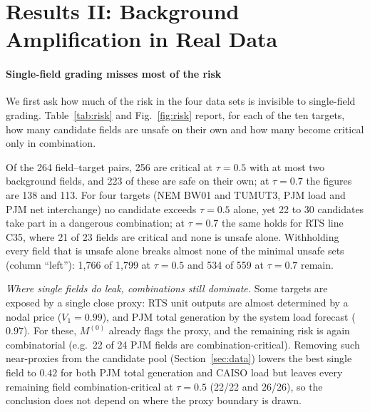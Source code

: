 \section{Results II: Background Amplification in Real Data}\label{sec:res-amp}

\paragraph{Single-field grading misses most of the risk}


We first ask how much of the risk in the four data sets is invisible to single-field grading.
Table~\ref{tab:risk} and Fig.~\ref{fig:risk} report, for each of the ten targets, how many
candidate fields are unsafe on their own and how many become critical only in combination.

Of the 264 field--target
pairs, 256 are critical at $\tau=0.5$ with at most two background fields, and 223 of these are
safe on their own; at $\tau=0.7$ the figures are 138 and 113. For four targets (NEM BW01 and
TUMUT3, PJM load and PJM net interchange) no candidate exceeds $\tau=0.5$ alone, yet 22 to 30
candidates take part in a dangerous combination; at $\tau=0.7$ the same holds for RTS line C35,
where 21 of 23 fields are critical and none is unsafe alone. Withholding every field that is unsafe alone
breaks almost none of the minimal unsafe sets (column ``left''): 1,766 of 1,799 at $\tau=0.5$
and 534 of 559 at $\tau=0.7$ remain.

\emph{Where single fields do leak, combinations still dominate.} Some targets are exposed by a
single close proxy: RTS unit outputs are almost determined by a nodal price ($V_1=0.99$), and
PJM total generation by the system load forecast ($0.97$). For these, $M^{(0)}$ already flags
the proxy, and the remaining risk is again combinatorial (e.g.\ 22 of 24 PJM fields are
combination-critical). Removing such near-proxies from the candidate pool
(Section~\ref{sec:data}) lowers the best single field to $0.42$ for both PJM total generation
and CAISO load but leaves every remaining field combination-critical at $\tau=0.5$ (22/22 and
26/26), so the conclusion does not depend on where the proxy boundary is drawn.

